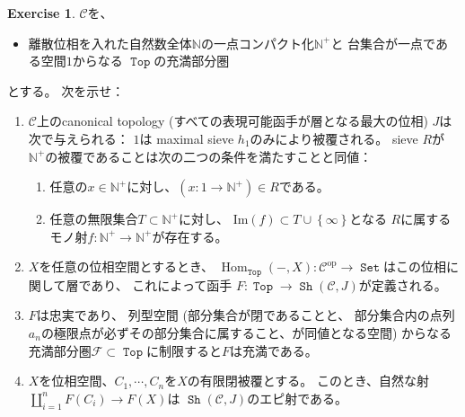 \documentclass[uplatex]{jsarticle}
\theoremstyle{definition}
\newtheorem{prob}[prob]{Exercise}
\newcommand{\op}{\mathrm{op}}
\DeclareMathOperator{\Hom}{Hom}
\newcommand{\im}{\mathrm{Im}}
\def\N{\mathbb{N}}
\def\mcC{\mathcal{C}}
\def\mcF{\mathcal{F}}
\DeclareMathOperator{\sfSet}{\mathtt{Set}}
\DeclareMathOperator{\sfTop}{\mathtt{Top}}
\DeclareMathOperator{\Sh}{\mathtt{Sh}}
\begin{document}
\begin{prob}\label{prob: 0.10}
  \(\mcC\)を、
  \begin{itemize}
    \item
    離散位相を入れた自然数全体\(\N\)の一点コンパクト化\(\N^+\)と
    台集合が一点である空間\(1\)からなる
    \(\sfTop\)の充満部分圏
  \end{itemize}
  とする。
  次を示せ：
  \begin{enumerate}
    \item \label{enumi: prob: 0.10.1}
    \(\mcC\)上のcanonical topology (すべての表現可能函手が層となる最大の位相)
    \(J\)は次で与えられる：
    \(1\)は maximal sieve \(h_1\)のみにより被覆される。
    sieve \(R\)が\(\N^+\)の被覆であることは次の二つの条件を満たすことと同値：
    \begin{enumerate}
      \item \label{enumi: prob: condition: 0.10.1.1}
      任意の\(x\in \N^+\)に対し、\( (x:1\to \N^+ )\in R\)である。
      \item \label{enumi: prob: condition: 0.10.1.2}
      任意の無限集合\(T\subset \N^+\)に対し、
      \(\im(f)\subset T\cup\left\{\infty\right\}\)となる
      \(R\)に属するモノ射\(f:\N^+\to \N^+\)が存在する。
    \end{enumerate}
    \item \label{enumi: prob: 0.10.2}
    \(X\)を任意の位相空間とするとき、
    \(\Hom_{\sfTop}(-,X):\mcC^{\op}\to \sfSet\)はこの位相に関して層であり、
    これによって函手
    \(F:\sfTop \to \Sh(\mcC,J)\)が定義される。
    \item \label{enumi: prob: 0.10.3}
    \(F\)は忠実であり、
    列型空間 (部分集合が閉であることと、
    部分集合内の点列\(a_n\)の極限点が必ずその部分集合に属すること、が同値となる空間)
    からなる充満部分圏\(\mcF\subset \sfTop\)に制限すると\(F\)は充満である。
    \item \label{enumi: prob: 0.10.4}
    \(X\)を位相空間、\(C_1,\cdots, C_n\)を\(X\)の有限閉被覆とする。
    このとき、自然な射\(\coprod_{i=1}^nF(C_i) \to F(X)\)は
    \(\Sh(\mcC,J)\)のエピ射である。
  \end{enumerate}
\end{prob}
\end{document}
